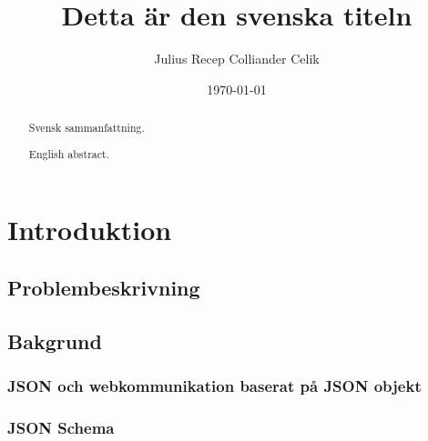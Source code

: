 \documentclass[swedish]{kththesis}
\title{Detta är den svenska titeln}
\author{Julius Recep Colliander Celik}
\date{\today}
\begin{document}
\frontmatter

\titlepage

\begin{abstract}
  Svensk sammanfattning.

  \blindtext
\end{abstract}


\begin{otherlanguage}{english}
  \begin{abstract}
    English abstract.

    \blindtext
  \end{abstract}
\end{otherlanguage}


\tableofcontents


\mainmatter


\chapter{Introduktion}


\section{Problembeskrivning}




\section{Bakgrund}

\subsection{JSON och webkommunikation baserat på JSON objekt}

\subsection{JSON Schema}
\end{document}

